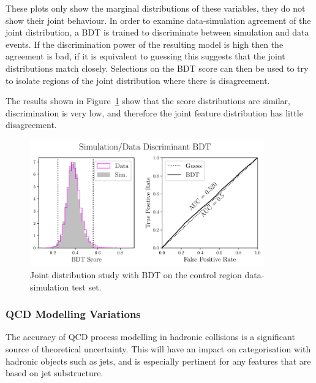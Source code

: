 These plots only show the marginal distributions of these variables, they do not show their joint behaviour. 
In order to examine data-simulation agreement of the joint distribution, a BDT is trained to discriminate between simulation and data events. 
If the discrimination power of the resulting model is high then the agreement is bad, if it is equivalent to guessing this suggests that the joint distributions match closely. 
Selections on the BDT score can then be used to try to isolate regions of the joint distribution where there is disagreement. 

The results shown in Figure~\ref{fig:event_categorisation:zee_bdt_validation} show that the score distributions are similar, discrimination is very low, and therefore the joint feature distribution has little disagreement.
\begin{figure}[h!]
    \begin{center}
    \includegraphics[width=0.9\textwidth]{figures/event_selection/eng_feature_ROC_Zee_BDT.pdf}
    \end{center}
    \caption{Joint distribution study with BDT on the \Zee control region data-simulation test set.}
    \label{fig:event_categorisation:zee_bdt_validation}
\end{figure}


\subsubsection{QCD Modelling Variations}
\label{chap:event_select:vbf_bdt:ueps_variants}
The accuracy of QCD process modelling in hadronic collisions is a significant source of theoretical uncertainty. 
This will have an impact on categorisation with hadronic objects such as jets, and is especially pertinent for any features that are based on jet substructure. 

